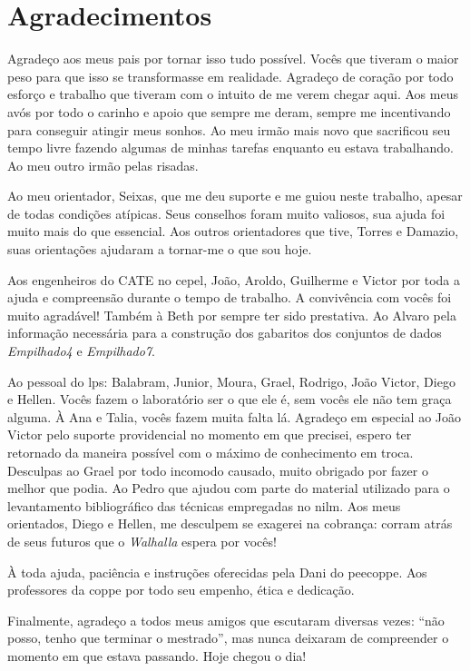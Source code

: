 \chapter*{Agradecimentos}

Agradeço aos meus pais por tornar isso tudo possível. Vocês que
tiveram o maior peso para que isso se transformasse em realidade.
Agradeço de coração por todo esforço e trabalho que tiveram com o
intuito de me verem chegar aqui. Aos meus avós por todo o carinho e
apoio que sempre me deram, sempre me incentivando para conseguir
atingir meus sonhos. Ao meu irmão mais novo que sacrificou seu tempo
livre fazendo algumas de minhas tarefas enquanto eu estava
trabalhando. Ao meu outro irmão pelas risadas.

Ao meu orientador, Seixas, que me deu suporte e me guiou neste
trabalho, apesar de todas condições atípicas. Seus conselhos foram
muito valiosos, sua ajuda foi muito mais do que essencial. Aos outros
orientadores que tive, Torres e Damazio, suas orientações ajudaram a
tornar-me o que sou hoje.

Aos engenheiros do CATE no \acl{cepel}, João, Aroldo, Guilherme e
Victor por toda a ajuda e compreensão durante o tempo de trabalho. A
convivência com vocês foi muito agradável! Também à Beth por sempre
ter sido prestativa. Ao Alvaro pela informação necessária
para a construção dos gabaritos dos conjuntos de dados
\emph{Empilhado4} e \emph{Empilhado7}.

Ao pessoal do \acs{lps}: Balabram, Junior, Moura, Grael, Rodrigo, João
Victor, Diego e Hellen. Vocês fazem o laboratório ser o que ele é, sem
vocês ele não tem graça alguma. À Ana e Talia, vocês fazem muita falta
lá. Agradeço em especial ao João Victor pelo suporte providencial no
momento em que precisei, espero ter retornado da maneira possível com
o máximo de conhecimento em troca. Desculpas ao Grael por todo
incomodo causado, muito obrigado por fazer o melhor que podia. Ao
Pedro que ajudou com parte do material utilizado para o
levantamento bibliográfico das técnicas empregadas no \acs{nilm}.
Aos meus orientados, Diego e Hellen, me desculpem se exagerei na
cobrança: corram atrás de seus futuros que o \emph{Walhalla} espera
por vocês!

À toda ajuda, paciência e instruções oferecidas pela Dani do
\acs{peecoppe}. Aos professores da \acs{coppe} por todo seu
empenho, ética e dedicação.

Finalmente, agradeço a todos meus amigos que escutaram diversas vezes:
``não posso, tenho que terminar o mestrado'', mas nunca deixaram de
compreender o momento em que estava passando. Hoje chegou o dia!

